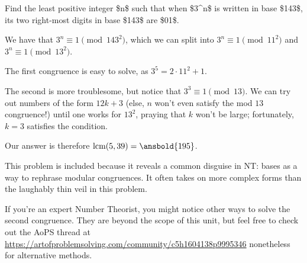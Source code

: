 \documentclass[mast]{lucky}
\begin{document}
\begin{exam}[AIME I 2018/11]
Find the least positive integer \$n\$ such that when \$3\textasciicircum n\$ is
written in base \$143\$, its two right-most digits in base \$143\$ are \$01\$.
\end{exam}
\begin{sol}
We have that $3^n\equiv 1\pmod{143^2}$, which we can split into $3^n\equiv 1\pmod{11^2}$ and $3^n\equiv 1\pmod{13^2}$.

The first congruence is easy to solve, as $3^5=2\cdot 11^2+1$.

The second is more troublesome, but notice that $3^3\equiv 1\pmod 13$. We can try out numbers of the form $12k+3$ (else, $n$ won't even satisfy the mod $13$ congruence!) until one works for $13^2$, praying that $k$ won't be large; fortunately, $k=3$ satisfies the condition.

Our answer is therefore $\text{lcm}(5,39)=\ansbold{195}$.
\end{sol}
\begin{remark}
This problem is included because it reveals a common disguise in NT: bases as a way to rephrase modular congruences. It often takes on more complex forms than the laughably thin veil in this problem.

If you're an expert Number Theorist, you might notice other ways to solve the second congruence. They are beyond the scope of this unit, but feel free to check out the AoPS thread at \url{https://artofproblemsolving.com/community/c5h1604138p9995346} nonetheless for alternative methods.
\end{remark}
\end{document}
